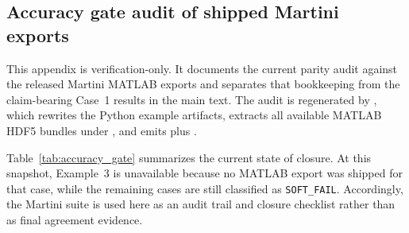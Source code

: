 \documentclass[11pt]{article}
\begin{document}
\subsection{Accuracy gate audit of shipped Martini exports}
\label{sec:accuracy_gate}

This appendix is verification-only.
It documents the current parity audit against the released Martini MATLAB exports and separates that bookkeeping from the claim-bearing Case~1 results in the main text.
The audit is regenerated by , which rewrites the Python example artifacts, extracts all available MATLAB HDF5 bundles under , and emits  plus .

Table~\ref{tab:accuracy_gate} summarizes the current state of closure.
At this snapshot, Example~3 is unavailable because no MATLAB export was shipped for that case, while the remaining cases are still classified as \texttt{SOFT\_FAIL}.
Accordingly, the Martini suite is used here as an audit trail and closure checklist rather than as final agreement evidence.
\end{document}
